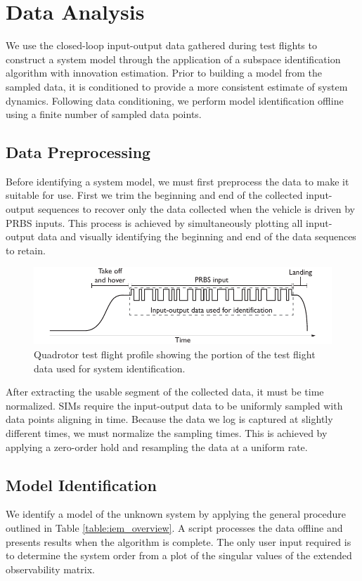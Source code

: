 \section{Data Analysis}
We use the closed-loop input-output data gathered during test flights to construct a system model through the application of a subspace identification algorithm with innovation estimation. Prior to building a model from the sampled data, it is conditioned to provide a more consistent estimate of system dynamics. Following data conditioning, we perform model identification offline using a finite number of sampled data points.


\subsection{Data Preprocessing}
Before identifying a system model, we must first preprocess the data to make it suitable for use. First we trim the beginning and end of the collected input-output sequences to recover only the data collected when the vehicle is driven by PRBS inputs. This process is achieved by simultaneously plotting all input-output data and visually identifying the beginning and end of the data sequences to retain.
\begin{figure}[htb!]
	\centering
	\includegraphics{../fig/test_flight_profile.pdf}
	\caption{Quadrotor test flight profile showing the portion of the test flight data used for system identification.}
	\label{fig:test_flight_profile}
\end{figure}

After extracting the usable segment of the collected data, it must be time normalized. SIMs require the input-output data to be uniformly sampled with data points aligning in time. Because the data we log is captured at slightly different times, we must normalize the sampling times. This is achieved by applying a zero-order hold and resampling the data at a uniform rate.


\subsection{Model Identification}
We identify a model of the unknown system by applying the general procedure outlined in Table \ref{table:iem_overview}. A \matlab script processes the data offline and presents results when the algorithm is complete. The only user input required is to determine the system order from a plot of the singular values of the extended observability matrix.

